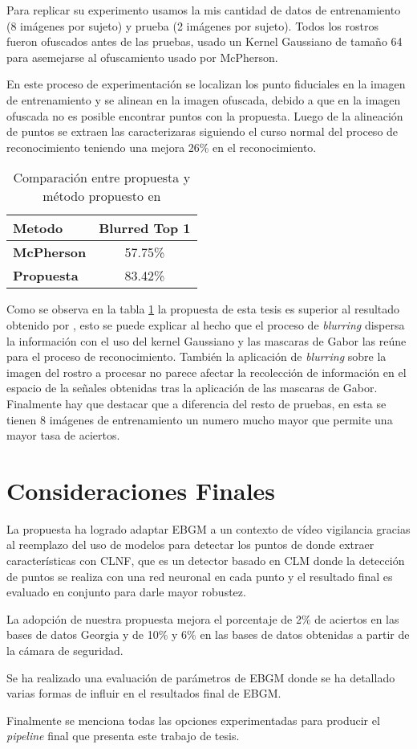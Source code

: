 Para replicar su experimento usamos la mis cantidad de datos de entrenamiento (8 imágenes por sujeto) y prueba (2 imágenes por sujeto). 
Todos los rostros fueron ofuscados antes de las pruebas, usado un Kernel Gaussiano de tamaño 64 para asemejarse al ofuscamiento usado por McPherson. 

En este proceso de experimentación se localizan los punto fiduciales en la imagen de entrenamiento y se alinean en la imagen ofuscada, debido a que en la imagen ofuscada no es posible encontrar puntos con la propuesta. Luego de la alineación de puntos se extraen las caracterizaras siguiendo el curso normal del proceso de reconocimiento teniendo una mejora 26\% en el reconocimiento.

\begin{table}[]
\centering
\caption{Comparación entre propuesta y método propuesto en \cite{mcpherson2016defeating}}
\label{ta::Blurred}
\begin{tabular}{|l|c|}
\hline
\textbf{Metodo}    & \textbf{Blurred Top 1} \\ \hline
\textbf{McPherson} & 57.75\%                \\ \hline
\textbf{Propuesta} & 83.42\%                \\ \hline
\end{tabular}
\end{table}

Como se observa en la tabla \ref{ta::Blurred} la propuesta de esta tesis es superior al resultado obtenido por \cite{mcpherson2016defeating}, esto se puede explicar al hecho que el proceso de \textit{blurring} dispersa la información con el uso del kernel Gaussiano y las mascaras de Gabor las reúne para el proceso de reconocimiento. También la aplicación de \textit{blurring} sobre la imagen del rostro a procesar no parece afectar la recolección de información en el espacio de la señales obtenidas tras la aplicación de las mascaras de Gabor. Finalmente hay que destacar que a diferencia del resto de pruebas, en esta se tienen 8 imágenes de entrenamiento un numero mucho mayor que permite una mayor tasa de aciertos.
	
\section{Consideraciones Finales}

La propuesta ha logrado adaptar \ac{EBGM} a un contexto de vídeo vigilancia gracias al reemplazo del uso de modelos para detectar los puntos de donde extraer características con \ac{CLNF}, que es un detector basado en \ac{CLM} donde la detección de puntos se realiza con una red neuronal en cada punto y el resultado final es evaluado en conjunto para darle mayor robustez.

La adopción de nuestra propuesta mejora el porcentaje de 2\% de aciertos en las bases de datos Georgia y de 10\% y 6\% en las bases de datos obtenidas a partir de la cámara de seguridad.

Se ha realizado una evaluación de parámetros de \ac{EBGM} donde se ha detallado varias formas de influir en el resultados final de \ac{EBGM}.  

Finalmente se menciona todas las opciones experimentadas para producir el \textit{pipeline} final que presenta este trabajo de tesis.
